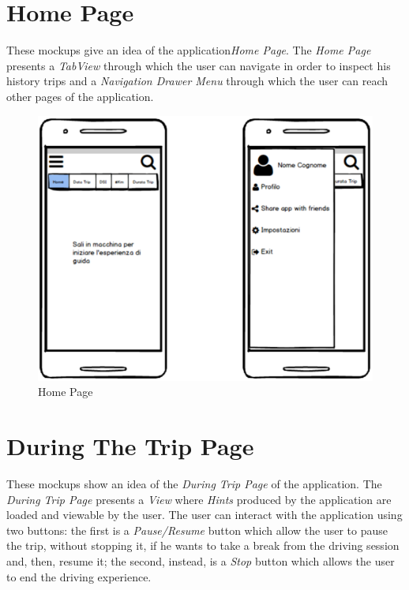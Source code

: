 \clearpage
\section{Home Page}
These mockups give an idea of the application\textit{Home Page}. The \textit{Home Page} presents a \textit{TabView} through which the user can navigate in order to inspect his history trips and a \textit{Navigation Drawer Menu} through which the user can reach other pages of the application.\\

\begin{figure}[htbp]
	\centering
	\begin{minipage}[b]{1\textwidth}
		\includegraphics[width=\textwidth]{cpt/img/HomePage.png}
		\caption{Home Page}
	\end{minipage}
\end{figure}

\clearpage
\section{During The Trip Page}
These mockups show an idea of the \textit{During Trip Page} of the application. The \textit{During Trip Page} presents a \textit{View} where \textit{Hints} produced by the application are loaded and viewable by the user. The user can interact with the application using two buttons: the first is a \textit{Pause/Resume} button which allow the user to pause the trip, without stopping it, if he wants to take a break from the driving session and, then, resume it; the second, instead, is a \textit{Stop} button which allows the user to end the driving experience.\\

